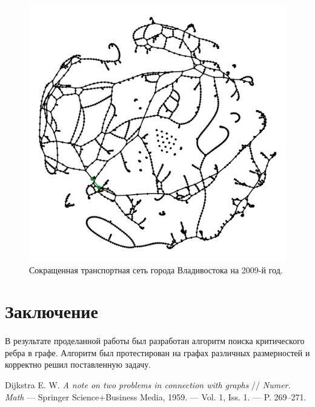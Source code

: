 \documentclass[12pt]{article}
\begin{document}
\begin{figure}[h]
    \centering
    \includegraphics[scale=0.3]{vlad_2009_min.png}
    \caption{Сокращенная транспортная сеть города Владивостока на 2009-й год.}
    \label{fig:vlad_2009_min}
\end{figure}

\section{Заключение}

\paragraph{}
В результате проделанной работы был разработан алгоритм поиска критического ребра в графе.
Алгоритм был протестирован на графах различных размерностей и корректно решил поставленную задачу.

\newpage

\begin{thebibliography}{9}
Dijkstra E. W. \textit{A note on two problems in connection with graphs} //
\textit{Numer. Math} — Springer Science+Business Media, 1959.
— Vol. 1, Iss. 1. — P. 269–271.
\end{thebibliography}
\end{document}
